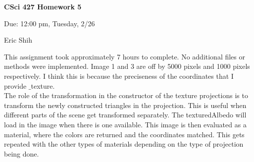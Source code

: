 \documentclass[11pt]{article}
\begin{document}
\begin{LARGE}
\centerline {\bf CSci 427 Homework 5}
\end{LARGE}
\vskip 0.25cm

\centerline{Due: 12:00 pm, Tuesday, 2/26}
\centerline{Eric Shih}

\setlength{\parindent}{1cm}
\indent This assignment took approximately 7 hours to complete. No additional files or methods were implemented. Image 1 and 3 are off
by 5000 pixels and 1000 pixels respectively. I think this is because the preciseness of the coordinates that I provide $\_$texture. \\
\indent The role of the transformation in the constructor of the texture projections is to transform the newly constructed triangles in the
projection. This is useful when different parts of the scene get transformed separately. The texturedAlbedo will load in the image when
there is one available. This image is then evaluated as a material, where the colors are returned and the coordinates matched. This gets
repeated with the other types of materials depending on the type of projection being done.
\end{document}
